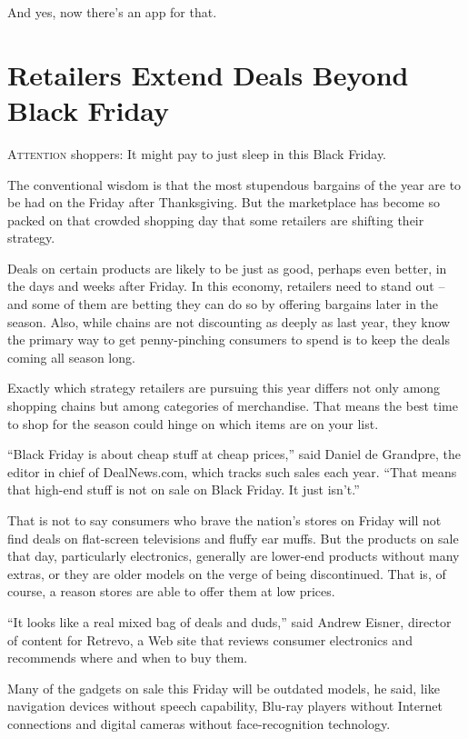 ﻿\documentclass[12pt]{article}
\begin{document}
And yes, now there's an app for that.

\section{Retailers Extend Deals Beyond Black Friday}

\lettrine{A}{ttention} shoppers: It might pay to just sleep in this Black
Friday.

The conventional wisdom is that the most stupendous bargains of the year are to be had on the Friday
after Thanksgiving. But the marketplace has become so packed on that crowded shopping day that some
retailers are shifting their strategy.

Deals on certain products are likely to be just as good, perhaps even better, in the days and weeks
after Friday. In this economy, retailers need to stand out -- and some of them are betting they can
do so by offering bargains later in the season. Also, while chains are not discounting as deeply as
last year, they know the primary way to get penny-pinching consumers to spend is to keep the deals
coming all season long.

Exactly which strategy retailers are pursuing this year differs not only among shopping chains but
among categories of merchandise. That means the best time to shop for the season could hinge on
which items are on your list.

``Black Friday is about cheap stuff at cheap prices,'' said Daniel de Grandpre, the editor in chief
of DealNews.com, which tracks such sales each year. ``That means that high-end stuff is not on sale
on Black Friday. It just isn't.''

That is not to say consumers who brave the nation's stores on Friday will not find deals on
flat-screen televisions and fluffy ear muffs. But the products on sale that day, particularly
electronics, generally are lower-end products without many extras, or they are older models on the
verge of being discontinued. That is, of course, a reason stores are able to offer them at low
prices.

``It looks like a real mixed bag of deals and duds,'' said Andrew Eisner, director of content for
Retrevo, a Web site that reviews consumer electronics and recommends where and when to buy them.

Many of the gadgets on sale this Friday will be outdated models, he said, like navigation devices
without speech capability, Blu-ray players without Internet connections and digital cameras without
face-recognition technology.
\end{document}

